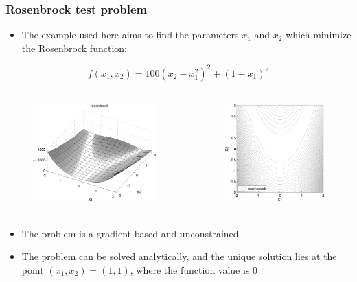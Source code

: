 \documentclass[t]{beamer}
\begin{document}
\begin{frame}
  \frametitle{Rosenbrock test problem}
  \begin{itemize}
    \item The example used here aims to find the parameters $x_1$ and $x_2$
          which minimize the Rosenbrock function:
  \end{itemize}
  \begin{equation}
    f\left(x_1,x_2\right) = 100\left(x_2-x_1^2\right)^2 + \left(1-x_1\right)^2
  \end{equation}
  \vskip -5mm
  \begin{columns}
    \begin{figure}
      \includegraphics[height=40mm]{images/rosenbrock_3d.png}
    \end{figure}
    \begin{figure}
      \includegraphics[height=40mm]{images/rosenbrock_contour.png}
    \end{figure}
  \end{columns}
  \begin{itemize}
    \item The problem is a gradient-based and unconstrained
    \item The problem can be solved analytically, and the unique solution lies
          at the point $\left(x_1,x_2\right) = \left(1,1\right)$, where the
          function value is 0
  \end{itemize}
\end{frame}

\end{document}
